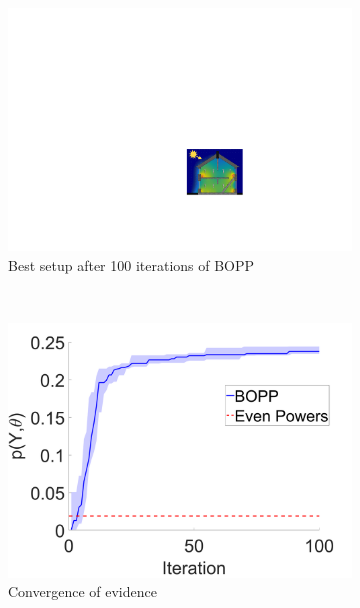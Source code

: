 \begin{figure}[p]
\begin{subfigure}[t]{0.47\textwidth}
				\includegraphics[width=\textwidth]{house-heating/100_iters.pdf}
				\caption{Best setup after 100 iterations of BOPP}
			\end{subfigure}
		~~~~ %
			\begin{subfigure}[t]{0.47\textwidth}
				\includegraphics[width=\textwidth]{house-heating/heating_rerun.pdf}
				\caption{Convergence of evidence}
			\end{subfigure}
	\caption{
		\label{fig:houses}
}
\end{figure}
